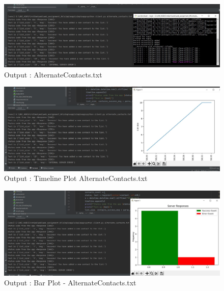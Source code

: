 \documentclass{resources/WeSTassignment}
\begin{document}
		\begin{figure}[ht]
    			\centering
    			\includegraphics[scale=0.4]{resources/finalAlternateServer.JPG}
    			\caption{Output : AlternateContacts.txt}
    			\label{fig: AlternateContacts.txt}
\end{figure}
 \begin{figure}[ht]
   			\centering
   			\includegraphics[scale=0.4]{resources/finalAlternateTimeline.JPG}
   			\caption{Output : Timeline Plot AlternateContacts.txt}
   			\label{fig: Timeline Plot - AlternateContacts.txt}
\end{figure}
 \begin{figure}[ht]
   			\centering
   			\includegraphics[scale=0.4]{resources/finalAlternateBarPlot.JPG}
   			\caption{Output : Bar Plot - AlternateContacts.txt}
   			\label{fig: Bar Plot-AlternateContacts.txt}
\end{figure}
\end{document}
